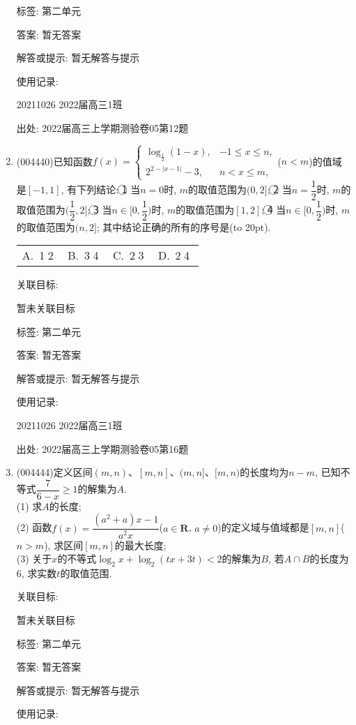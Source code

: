 \documentclass[10pt,a4paper]{article}
\newcommand{\bracket}[1]{(\hbox to #1pt{})}
\newcommand{\fourch}[4]{\par\begin{tabular}{p{.23\textwidth}p{.23\textwidth}p{.23\textwidth}p{.23\textwidth}}
A.~#1 &B.~#2& C.~#3& D.~#4
\end{tabular}}
\begin{document}
\begin{enumerate}[1.]
标签: 第二单元

答案: 暂无答案

解答或提示: 暂无解答与提示

使用记录:

20211026	2022届高三1班	


出处: 2022届高三上学期测验卷05第12题
\item { (004440)}已知函数$f(x)=\begin{cases}\log_{\frac 12}(1-x), & -1\le x\le n,  \\ 2^{2-|x-1|}-3, & n<x\le m,  \end{cases}$($n<m$)的值域是$[-1,1]$, 有下列结论:
\textcircled{1} 当$n=0$时, $m$的取值范围为$(0,2]$; \textcircled{2}  当$n=\dfrac 12$时, $m$的取值范围为$(\dfrac 12,2]$; \textcircled{3}  当$n\in [0,\dfrac 12)$时, $m$的取值范围为$[1,2]$; \textcircled{4}  当$n\in [0,\dfrac 12)$时, $m$的取值范围为$(n,2]$;
其中结论正确的所有的序号是\bracket{20}.
\fourch{\textcircled{1}\textcircled{2}}{\textcircled{3}\textcircled{4}}{\textcircled{2}\textcircled{3}}{\textcircled{2}\textcircled{4}}


关联目标:

暂未关联目标



标签: 第二单元

答案: 暂无答案

解答或提示: 暂无解答与提示

使用记录:

20211026	2022届高三1班	


出处: 2022届高三上学期测验卷05第16题
\item { (004444)}定义区间$(m,n)$、$[m,n]$、$(m,n]$、$[m,n)$的长度均为$n-m$, 已知不等式$\dfrac 7{6-x}\ge 1$的解集为$A$.\\
(1) 求$A$的长度;\\
(2) 函数$f(x)=\dfrac{(a^2+a)x-1}{a^2x}$($a\in \mathbf{R}$, $a\ne 0$)的定义域与值域都是$[m,n]$($n>m$), 求区间$[m,n]$的最大长度;\\
(3) 关于$x$的不等式$\log_2x+\log_2(tx+3t)<2$的解集为$B$, 若$A\cap B$的长度为$6$, 求实数$t$的取值范围.


关联目标:

暂未关联目标



标签: 第二单元

答案: 暂无答案

解答或提示: 暂无解答与提示

使用记录:


\end{enumerate}
\end{document}

